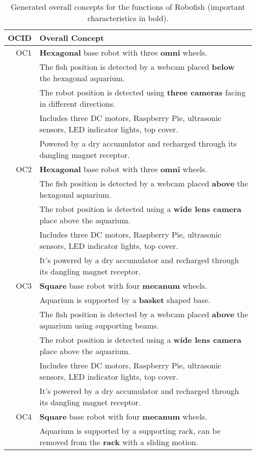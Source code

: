 \documentclass[a4paper, 10pt, DIV=16, parskip = full, twocolumn = true]{scrartcl}
\begin{document}
\begin{table*}
\centering
\caption{Generated overall concepts for the functions of Robofish (important characteristics in bold).}
	\begin{tabular}{rl}
	\toprule
		OCID & Overall Concept \\
	\midrule
		OC1 & \textbf{Hexagonal} base robot with three \textbf{omni} wheels. \\ 
		& The fish position is detected by a webcam placed \textbf{below} the hexagonal aquarium. \\
		& The robot position is detected using \textbf{three cameras} facing in different directions. \\
		& Includes three DC motors, Raspberry Pie, ultrasonic sensors, LED indicator lights, top cover. \\
		& Powered by a dry accumulator and recharged through its dangling magnet receptor.\\
		OC2 & \textbf{Hexagonal} base robot with three \textbf{omni} wheels. \\
		& The fish position is detected by a webcam placed \textbf{above} the hexagonal aquarium. \\
		& The robot position is detected using a \textbf{wide lens camera} place above the aquarium. \\
		& Includes three DC motors, Raspberry Pie, ultrasonic sensors, LED indicator lights, top cover. \\
		& It's powered by a dry accumulator and recharged through its dangling magnet receptor.\\
		OC3 & \textbf{Square} base robot with four \textbf{mecanum} wheels. \\
		& Aquarium is supported by a \textbf{basket} shaped base. \\
		& The fish position is detected by a webcam placed \textbf{above} the aquarium using supporting beams. \\
		& The robot position is detected using a \textbf{wide lens camera} place above the aquarium. \\ 
		& Includes three DC motors, Raspberry Pie, ultrasonic sensors, LED indicator lights, top cover. \\
		& It's powered by a dry accumulator and recharged through its dangling magnet receptor.\\
		OC4 & \textbf{Square} base robot with four \textbf{mecanum} wheels. \\
		& Aquarium is supported by a supporting rack, can be removed from the \textbf{rack} with a sliding motion. \\

\end{tabular}
\end{table*}
\end{document}
